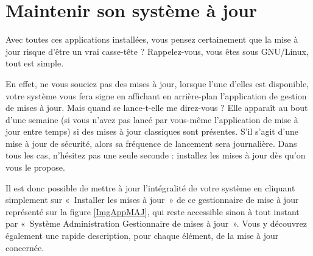 {\section{Maintenir son système à jour}
Avec toutes ces applications installées, vous pensez certainement que la mise à jour risque d'être un vrai casse-tête ? Rappelez-vous, vous êtes sous GNU/Linux, tout est simple.\par
En effet, ne vous souciez pas des mises à jour, lorsque l'une d'elles est disponible, votre système vous fera signe en affichant en arrière-plan l'application de gestion de mises à jour. Mais quand se lance-t-elle me direz-vous ? Elle apparaît au bout d'une semaine (si vous n'avez pas lancé par vous-même l'application de mise à jour entre temps) si des mises à jour classiques sont présentes. S'il s'agit d'une mise à jour de sécurité, alors sa fréquence de lancement sera journalière. Dans tous les cas, n'hésitez pas une seule seconde : installez les mises à jour dès qu'on vous le propose.\par
Il est donc possible de mettre à jour l'intégralité de votre système en cliquant simplement sur «~Installer les mises à jour~» de ce gestionnaire de mise à jour représenté sur la figure \ref{ImgAppMAJ}, qui reste accessible sinon à tout instant par «~Système \FlecheDroite Administration \FlecheDroite Gestionnaire de mises à jour~». Vous y découvrez également une rapide description, pour chaque élément, de la mise à jour concernée.
}
